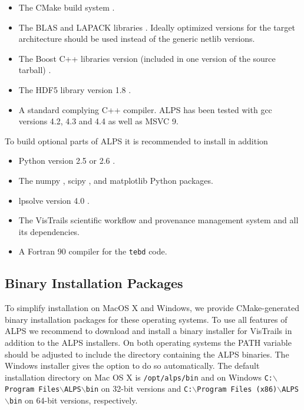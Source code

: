 \documentclass[12pt]{iopart}
\begin{document}
\begin{itemize}
\item The CMake build system \cite{cmake}.
\item The BLAS \cite{blasnetlib} and LAPACK libraries \cite{lapack}. Ideally optimized versions for the target architecture should be used instead of the generic netlib versions.
\item The Boost C++ libraries version (included in one version of the source tarball) \cite{boost}.
\item The HDF5 library version 1.8 \cite{hdf5}.
\item A standard complying C++ compiler. ALPS has been tested with gcc versions 4.2, 4.3 and 4.4 as well as MSVC 9.
\end{itemize}
To build optional parts of ALPS it is recommended to install in addition
\begin{itemize}
\item Python version 2.5 or 2.6 \cite{python}.
\item The numpy \cite{numpy}, scipy \cite{scipy}, and matplotlib \cite{matplotlib} Python packages.
\item lpsolve version 4.0 \cite{lpsolve}.
\item The VisTrails scientific workflow and provenance management system \cite{vistrails} and all its dependencies.
\item A Fortran 90 compiler for the {\tt tebd} code.
\end{itemize}

\subsection{Binary Installation Packages}

To simplify installation on MacOS X and Windows, we provide CMake-generated binary installation packages for these operating systems. To use all features of ALPS we recommend to download and install a binary installer for VisTrails \cite{vistrails} in addition to the ALPS installers. On both operating systems the PATH variable should be adjusted to include the directory containing the ALPS binaries. The Windows installer gives the option to do so automatically. The default installation directory on Mac OS X is {\tt /opt/alps/bin} and on Windows {\tt C:$\backslash$Program Files$\backslash$ALPS$\backslash$bin} on 32-bit versions and  {\tt C:$\backslash$Program Files (x86)$\backslash$ALPS$\backslash$bin} on 64-bit versions, respectively.
\end{document}
